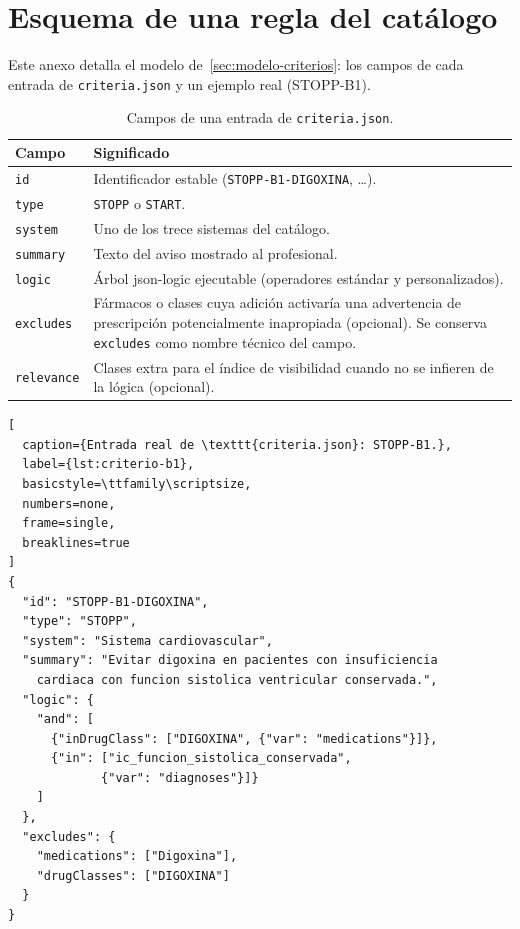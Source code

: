 \chapter{Esquema de una regla del catálogo}
\label{anexo:esquema-criterio}

Este anexo detalla el modelo de~\cref{sec:modelo-criterios}: los campos de
cada entrada de \texttt{criteria.json} y un ejemplo real (STOPP-B1).

\begin{table}[H]
  \centering
  \scriptsize
  \begin{tabular}{@{}lp{10.2cm}@{}}
    \toprule
    \textbf{Campo} & \textbf{Significado} \\
    \midrule
    \texttt{id} & Identificador estable (\texttt{STOPP-B1-DIGOXINA}, \ldots). \\
    \texttt{type} & \texttt{STOPP} o \texttt{START}. \\
    \texttt{system} & Uno de los trece sistemas del catálogo. \\
    \texttt{summary} & Texto del aviso mostrado al profesional. \\
    \texttt{logic} & Árbol json-logic ejecutable (operadores estándar y
      personalizados). \\
    \texttt{excludes} & Fármacos o clases cuya adición activaría una
      advertencia de prescripción potencialmente inapropiada (opcional).
      Se conserva \texttt{excludes} como nombre técnico del campo. \\
    \texttt{relevance} & Clases extra para el índice de visibilidad cuando no
      se infieren de la lógica (opcional). \\
    \bottomrule
  \end{tabular}
  \caption{Campos de una entrada de \texttt{criteria.json}.}
  \label{tab:campos-criterio}
\end{table}

\begin{lstlisting}[
  caption={Entrada real de \texttt{criteria.json}: STOPP-B1.},
  label={lst:criterio-b1},
  basicstyle=\ttfamily\scriptsize,
  numbers=none,
  frame=single,
  breaklines=true
]
{
  "id": "STOPP-B1-DIGOXINA",
  "type": "STOPP",
  "system": "Sistema cardiovascular",
  "summary": "Evitar digoxina en pacientes con insuficiencia
    cardiaca con funcion sistolica ventricular conservada.",
  "logic": {
    "and": [
      {"inDrugClass": ["DIGOXINA", {"var": "medications"}]},
      {"in": ["ic_funcion_sistolica_conservada",
             {"var": "diagnoses"}]}
    ]
  },
  "excludes": {
    "medications": ["Digoxina"],
    "drugClasses": ["DIGOXINA"]
  }
}
\end{lstlisting}

